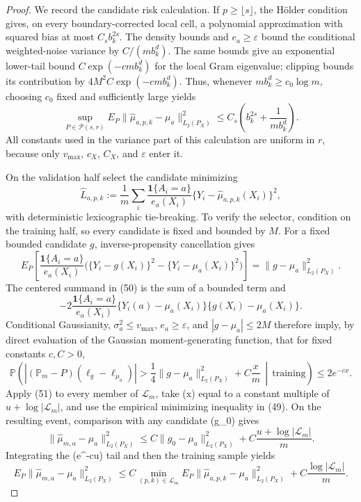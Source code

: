 \documentclass{article}
\begin{document}
\begin{proof}
We record the candidate risk calculation.  If \(p\geq\lfloor s\rfloor\), the Hölder condition gives, on every boundary-corrected local cell, a polynomial approximation with squared bias at most \(C_s b_k^{2s}\).  The density bounds and \(e_a\geq\varepsilon\) bound the conditional weighted-noise variance by \(C/(m b_k^d)\).  The same bounds give an exponential lower-tail bound \(C\exp(-c m b_k^d)\) for the local Gram eigenvalue; clipping bounds its contribution by \(4M^2C\exp(-c m b_k^d)\).  Thus, whenever \(m b_k^d\geq c_0\log m\), choosing \(c_0\) fixed and sufficiently large yields
\[
\sup_{P\in\mathcal P(s,r)}
E_P\|\widehat\mu_{a,p,k}-\mu_a\|_{L_2(P_X)}^2
\leq C_s\left(b_k^{2s}+\frac{1}{m b_k^d}\right).
\tag{48}
\]
All constants used in the variance part of this calculation are uniform in \(r\), because only \(v_{\max}\), \(c_X\), \(C_X\), and \(\varepsilon\) enter it.

On the validation half select the candidate minimizing
\[
\widehat L_{a,p,k}
:=\frac1m\sum_{i}
\frac{\mathbf 1\{A_i=a\}}{e_a(X_i)}
\{Y_i-\widehat\mu_{a,p,k}(X_i)\}^2,
\tag{49}
\]
with deterministic lexicographic tie-breaking.  To verify the selector, condition on the training half, so every candidate is fixed and bounded by \(M\).  For a fixed bounded candidate \(g\), inverse-propensity cancellation gives
\[
E_P\!\left[
\frac{\mathbf 1\{A_i=a\}}{e_a(X_i)}
\bigl(\{Y_i-g(X_i)\}^2-\{Y_i-\mu_a(X_i)\}^2\bigr)
\right]
=\|g-\mu_a\|_{L_2(P_X)}^2.
\tag{50}
\]
The centered summand in (50) is the sum of a bounded term and
\[
-2\frac{\mathbf 1\{A_i=a\}}{e_a(X_i)}
\{Y_i(a)-\mu_a(X_i)\}\{g(X_i)-\mu_a(X_i)\}.
\]
Conditional Gaussianity, \(\sigma_a^2\leq v_{\max}\), \(e_a\geq\varepsilon\), and \(|g-\mu_a|\leq2M\) therefore imply, by direct evaluation of the Gaussian moment-generating function, that for fixed constants \(c,C>0\),
\[
\mathbb P\!\left(
|(\mathbb P_m-P)(\ell_g-\ell_{\mu_a})|
>\frac14\|g-\mu_a\|_{L_2(P_X)}^2+C\frac{x}{m}
\,\middle|\,\text{training}
\right)
\leq 2e^{-cx}.
\tag{51}
\]
Apply (51) to every member of \(\mathcal L_m\), take (x) equal to a constant multiple of \(u+\log|\mathcal L_m|\), and use the empirical minimizing inequality in (49).  On the resulting event, comparison with any candidate (g\_0) gives
\[
\|\widehat\mu_{m,a}-\mu_a\|_{L_2(P_X)}^2
\leq C\|g_0-\mu_a\|_{L_2(P_X)}^2
+C\frac{u+\log|\mathcal L_m|}{m}.
\]
Integrating the (e\textasciicircum{}{-cu}) tail and then the training sample yields
\[
E_P\|\widehat\mu_{m,a}-\mu_a\|_{L_2(P_X)}^2
\leq C\min_{(p,k)\in\mathcal L_m}
E_P\|\widehat\mu_{a,p,k}-\mu_a\|_{L_2(P_X)}^2
+C\frac{\log|\mathcal L_m|}{m}.
\tag{52}
\]


\end{proof}
\end{document}
